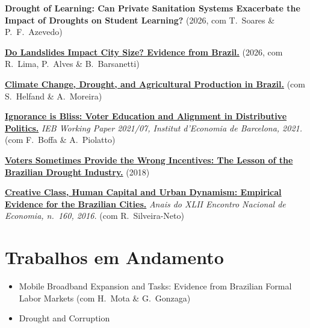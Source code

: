 \documentclass[a4paper,9pt]{article}
\newcommand{\cvgap}{\vspace{2mm}}
\begin{document}
\cvgap

\textbf{Drought of Learning: Can Private Sanitation Systems Exacerbate the Impact of Droughts on Student Learning?} (2026, com T.~Soares \& P.~F.~Azevedo)

\cvgap

\textbf{\href{https://www.researchgate.net/profile/Ricardo-Carvalho-10/publication/383129940_Do_Landslides_Impact_Urbanization_Patterns_Evidence_from_Brazilian_Cities/links/66be0c688d0073559255b1e4/Do-Landslides-Impact-Urbanization-Patterns-Evidence-from-Brazilian-Cities.pdf}{Do Landslides Impact City Size? Evidence from Brazil.}} (2026, com R.~Lima, P.~Alves \& B.~Barsanetti)

\cvgap

\textbf{\href{https://economics.ucr.edu/docs/helfand/Helfand\%20Climate\%20Change,\%20Drought,\%20and\%20Ag\%20Prod\%20in\%20Brazil\%208-2024.pdf}{Climate Change, Drought, and Agricultural Production in Brazil.}} (com S.~Helfand \& A.~Moreira)

\cvgap

\textbf{\href{http://diposit.ub.edu/dspace/handle/2445/182602}{Ignorance is Bliss: Voter Education and Alignment in Distributive Politics.}} \emph{IEB Working Paper 2021/07, Institut d'Economia de Barcelona, 2021.} (com F.~Boffa \& A.~Piolatto)

\cvgap

\textbf{\href{https://mpra.ub.uni-muenchen.de/88317/}{Voters Sometimes Provide the Wrong Incentives: The Lesson of the Brazilian Drought Industry.}} (2018)

\cvgap

\textbf{\href{https://www.researchgate.net/publication/319902513_Creative_Class_Human_Capital_and_Urban_Dynamism_Empirical_Evidence_for_the_Brazilian_Cities}{Creative Class, Human Capital and Urban Dynamism: Empirical Evidence for the Brazilian Cities.}} \emph{Anais do XLII Encontro Nacional de Economia, n.~160, 2016.} (com R.~Silveira-Neto)

\section{Trabalhos em Andamento}

\begin{itemize}
\item Mobile Broadband Expansion and Tasks: Evidence from Brazilian Formal Labor Markets (com H.~Mota \& G.~Gonzaga)
\item Drought and Corruption
\end{itemize}
\end{document}
